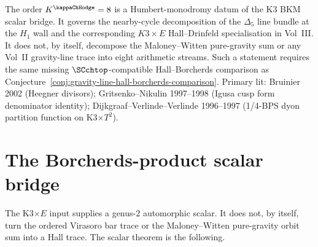 \begin{remark}[What \(K^{\kappaChHodge}=8\) controls in the K3 scalar lane]
\label{rem:3dg-gelfand-modular-sum-8}
The order \(K^{\kappaChHodge}=8\) is a Humbert-monodromy
datum of the K3 BKM scalar bridge. It governs the nearby-cycle
decomposition of the \(\Delta_5\) line bundle at the \(H_1\) wall and
the corresponding \(K3\times E\) Hall--Drinfeld specialisation in
Vol~III. It does not, by itself, decompose the Maloney--Witten
pure-gravity sum or any Vol~II gravity-line trace into eight
arithmetic streams. Such a statement requires the same missing
\(\SCchtop\)-compatible Hall--Borcherds comparison as
Conjecture~\ref{conj:gravity-line-hall-borcherds-comparison}.
Primary lit: Bruinier 2002 (Heegner divisors);
Gritsenko--Nikulin 1997--1998 (Igusa cusp form denominator
identity); Dijkgraaf--Verlinde--Verlinde 1996--1997
(1/4-BPS dyon partition function on K3$\times T^2$).
\end{remark}

\section{The Borcherds-product scalar bridge}
\label{sec:3dg-borcherds-ensemble-bridge}

The K3$\times E$ input supplies a genus-$2$ automorphic scalar. It
does not, by itself, turn the ordered Virasoro bar trace or the
Maloney--Witten pure-gravity orbit sum into a Hall trace. The scalar
theorem is the following.

